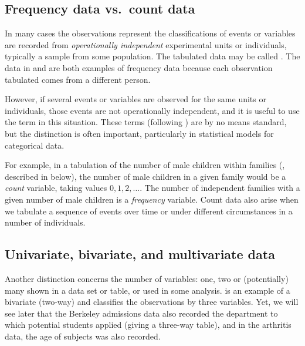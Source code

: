 \documentclass[11pt]{book}\usepackage[]{graphicx}\usepackage[]{color}
\begin{document}
\subsection{Frequency data vs.\ count data}\label{sec:freq-count}
In many cases the observations represent the classifications of events or variables are 
recorded from \emph{operationally independent} experimental units or individuals, typically
a sample from some population.  The tabulated data may be called
.  The data in  and 
are both examples of frequency data because each observation tabulated
comes from a different person.

However, if several events or variables are observed for the same units or individuals, those events are not
operationally independent, and it is useful to use the term 
 in this situation.  These terms (following
\citet{Lindsey:95}) are by no means standard, but
the distinction is often important, particularly in statistical
models for categorical data.  

For example, in a tabulation of the number of male
children within families (, described in
 below), 
the number of male children in a given family would be a \emph{count} variable,
taking values $0, 1, 2, \dots$.  The number of independent families with
a given number of male children is a \emph{frequency} variable.
Count data also arise when we tabulate a sequence of events over time
or under different circumstances in a number of individuals.



\subsection{Univariate, bivariate, and multivariate data}\label{sec:uni-multi}
Another distinction concerns the number of variables: one, two or
(potentially) many shown in a data set or table, or used in some
analysis.
 is an example of a bivariate (two-way) \ctab
and  classifies the observations by three variables.
Yet, we will see later
that the Berkeley admissions data also recorded
the department to which potential students applied (giving a three-way
table), and in the arthritis data, the age of subjects was also
recorded.
\end{document}
